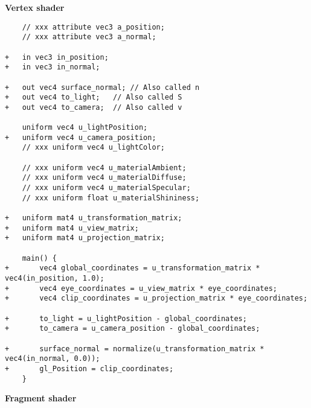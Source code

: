 \newpage
\textbf{Vertex shader}
\small
\begin{lstlisting}
    // xxx attribute vec3 a_position; 
    // xxx attribute vec3 a_normal; 

+   in vec3 in_position;
+   in vec3 in_normal;

+   out vec4 surface_normal; // Also called n
+   out vec4 to_light;   // Also called S
+   out vec4 to_camera;  // Also called v

    uniform vec4 u_lightPosition;
+   uniform vec4 u_camera_position;
    // xxx uniform vec4 u_lightColor; 
 
    // xxx uniform vec4 u_materialAmbient; 
    // xxx uniform vec4 u_materialDiffuse; 
    // xxx uniform vec4 u_materialSpecular; 
    // xxx uniform float u_materialShininess; 

+   uniform mat4 u_transformation_matrix;
+   uniform mat4 u_view_matrix;
+   uniform mat4 u_projection_matrix;

    main() {
+       vec4 global_coordinates = u_transformation_matrix * vec4(in_position, 1.0);
+       vec4 eye_coordinates = u_view_matrix * eye_coordinates;
+       vec4 clip_coordinates = u_projection_matrix * eye_coordinates;

+       to_light = u_lightPosition - global_coordinates;
+       to_camera = u_camera_position - global_coordinates;

+       surface_normal = normalize(u_transformation_matrix * vec4(in_normal, 0.0));
+       gl_Position = clip_coordinates;
    }
\end{lstlisting}
\normalsize

\newpage
\textbf{Fragment shader}

